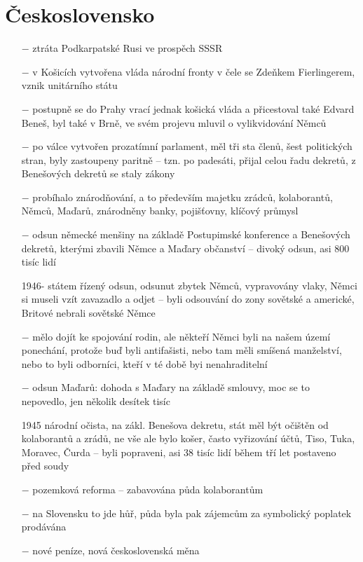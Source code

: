 \documentclass{article}
\begin{document}
\section*{Československo}
\begin{itemize}
    \vspace{-0.5em}
    \setlength\itemsep{0.15em}
    \item[$-$] ztráta Podkarpatské Rusi ve prospěch SSSR
    \item[$-$] v Košicích vytvořena vláda národní fronty v čele se Zdeňkem Fierlingerem, vznik unitárního státu
    \item[$-$] postupně se do Prahy vrací jednak košická vláda a přicestoval také Edvard Beneš, byl také v Brně, ve svém projevu mluvil o vylikvidování Němců
    \item[$-$] po válce vytvořen prozatímní parlament, měl tři sta členů, šest politických stran, byly zastoupeny paritně -- tzn. po padesáti, přijal celou řadu dekretů, z Benešových dekretů se staly zákony
    \item[$-$] probíhalo znárodňování, a to především majetku zrádců, kolaborantů, Němců, Maďarů, znárodněny banky, pojišťovny, klíčový průmysl
    \item[$-$] odsun německé menšiny na základě Postupimské konference a Benešových dekretů, kterými zbavili Němce a Maďary občanství -- divoký odsun, asi 800 tisíc lidí
    \item[1946-] státem řízený odsun, odsunut zbytek Němců, vypravovány vlaky, Němci si museli vzít zavazadlo a odjet -- byli odsouvání do zony sovětské a americké, Britové nebrali sovětské Němce
    \item[$-$] mělo dojít ke spojování rodin, ale někteří Němci byli na našem území ponechání, protože buď byli antifašisti, nebo tam měli smíšená manželství, nebo to byli odborníci, kteří v té době byi nenahraditelní
    \item[$-$] odsun Maďarů: dohoda s Maďary na základě smlouvy, moc se to nepovedlo, jen několik desítek tisíc
    \item[1945] národní očista, na zákl. Benešova dekretu, stát měl být očištěn od kolaborantů a zrádů, ne vše ale bylo košer, často vyřizování účtů, Tiso, Tuka, Moravec, Čurda -- byli popraveni, asi 38 tisíc lidí během tří let postaveno před soudy
    \item[$-$] pozemková reforma -- zabavována půda kolaborantům
    \item[$-$] na Slovensku to jde hůř, půda byla pak zájemcům za symbolický poplatek prodávána
    \item[$-$] nové peníze, nová československá měna

\end{itemize}
\end{document}
